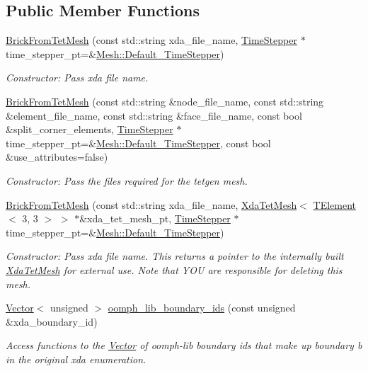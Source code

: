 \subsection*{Public Member Functions}
\begin{DoxyCompactItemize}
\item 
\hyperlink{classoomph_1_1BrickFromTetMesh_abed00a445cc3c6b6cc00d32e0db4a366}{Brick\+From\+Tet\+Mesh} (const std\+::string xda\+\_\+file\+\_\+name, \hyperlink{classoomph_1_1TimeStepper}{Time\+Stepper} $\ast$time\+\_\+stepper\+\_\+pt=\&\hyperlink{classoomph_1_1Mesh_a12243d0fee2b1fcee729ee5a4777ea10}{Mesh\+::\+Default\+\_\+\+Time\+Stepper})
\begin{DoxyCompactList}\small\item\em Constructor\+: Pass xda file name. \end{DoxyCompactList}\item 
\hyperlink{classoomph_1_1BrickFromTetMesh_af05fe6ff520986d7794c467fc1885f92}{Brick\+From\+Tet\+Mesh} (const std\+::string \&node\+\_\+file\+\_\+name, const std\+::string \&element\+\_\+file\+\_\+name, const std\+::string \&face\+\_\+file\+\_\+name, const bool \&split\+\_\+corner\+\_\+elements, \hyperlink{classoomph_1_1TimeStepper}{Time\+Stepper} $\ast$time\+\_\+stepper\+\_\+pt=\&\hyperlink{classoomph_1_1Mesh_a12243d0fee2b1fcee729ee5a4777ea10}{Mesh\+::\+Default\+\_\+\+Time\+Stepper}, const bool \&use\+\_\+attributes=false)
\begin{DoxyCompactList}\small\item\em Constructor\+: Pass the files required for the tetgen mesh. \end{DoxyCompactList}\item 
\hyperlink{classoomph_1_1BrickFromTetMesh_a49d6a583221a04f2997dae4509592350}{Brick\+From\+Tet\+Mesh} (const std\+::string xda\+\_\+file\+\_\+name, \hyperlink{classoomph_1_1XdaTetMesh}{Xda\+Tet\+Mesh}$<$ \hyperlink{classoomph_1_1TElement}{T\+Element}$<$ 3, 3 $>$ $>$ $\ast$\&xda\+\_\+tet\+\_\+mesh\+\_\+pt, \hyperlink{classoomph_1_1TimeStepper}{Time\+Stepper} $\ast$time\+\_\+stepper\+\_\+pt=\&\hyperlink{classoomph_1_1Mesh_a12243d0fee2b1fcee729ee5a4777ea10}{Mesh\+::\+Default\+\_\+\+Time\+Stepper})
\begin{DoxyCompactList}\small\item\em Constructor\+: Pass xda file name. This returns a pointer to the internally built \hyperlink{classoomph_1_1XdaTetMesh}{Xda\+Tet\+Mesh} for external use. Note that Y\+OU are responsible for deleting this mesh. \end{DoxyCompactList}\item 
\hyperlink{classoomph_1_1Vector}{Vector}$<$ unsigned $>$ \hyperlink{classoomph_1_1BrickFromTetMesh_aeca8c8e899bdafb9eb24f36c500c7df6}{oomph\+\_\+lib\+\_\+boundary\+\_\+ids} (const unsigned \&xda\+\_\+boundary\+\_\+id)
\begin{DoxyCompactList}\small\item\em Access functions to the \hyperlink{classoomph_1_1Vector}{Vector} of oomph-\/lib boundary ids that make up boundary b in the original xda enumeration. \end{DoxyCompactList}\end{DoxyCompactItemize}
